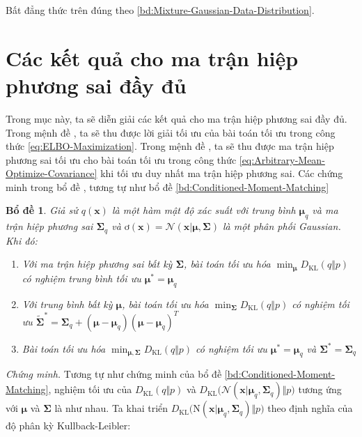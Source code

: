 \documentclass[14pt, a4paper]{article}
\numberwithin{equation}{section}
\numberwithin{figure}{section}
\newtheorem{bd}{Bổ đề}
\numberwithin{dl}{section}
\numberwithin{md}{section}
\numberwithin{bd}{section}
\numberwithin{dn}{section}
\numberwithin{hq}{section}
\begin{document}
    Bất đẳng thức trên đúng theo \ref{bd:Mixture-Gaussian-Data-Distribution}.

    \section{Các kết quả cho ma trận hiệp phương sai đầy đủ}

    Trong mục này, ta sẽ diễn giải các kết quả cho ma trận hiệp phương sai đầy đủ. 
    Trong mệnh đề , ta sẽ thu được lời giải tối ưu của bài toán tối ưu trong công thức \ref{eq:ELBO-Maximization}.
    Trong mệnh đề , ta sẽ thu được ma trận hiệp phương sai tối ưu cho bài toán tối ưu trong công thức \ref{eq:Arbitrary-Mean-Optimize-Covariance} khi tối ưu duy nhất ma trận hiệp phương sai.
    Các chứng minh trong bổ đề , tương tự như bổ đề \ref{bd:Conditioned-Moment-Matching}

    \begin{bd} \label{bd:Joint-Optimal-Solution-Full-Covariance}
        Giả sử $q(\boldsymbol{x})$ là một hàm mật độ xác suất với trung bình $\boldsymbol{\mu}_q$ và ma trận hiệp phương sai $\boldsymbol{\Sigma}_q$ và $ơ(\boldsymbol{x})=\mathcal{N}(\boldsymbol{x} \vert \boldsymbol{\mu}, \boldsymbol{\Sigma})$ là một phân phối Gaussian. Khi đó:

        \begin{enumerate}
            \item Với ma trận hiệp phương sai bất kỳ $\boldsymbol{\Sigma}$, bài toán tối ưu hóa $\displaystyle\min_{\boldsymbol{\mu}} D_{\mathrm{KL}} (q \Vert p)$ có nghiệm trung bình tối ưu $\boldsymbol{\mu}^{\ast}=\boldsymbol{\mu}_q$
            \item Với trung bình bất kỳ $\boldsymbol{\mu}$, bài toán tối ưu hóa $\displaystyle\min_{\boldsymbol{\Sigma}} D_{\mathrm{KL}} (q \Vert p)$ có nghiệm tối ưu $\tilde{\boldsymbol{\Sigma}}^{\ast}=\boldsymbol{\Sigma}_q + (\boldsymbol{\mu} - \boldsymbol{\mu}_q)(\boldsymbol{\mu} - \boldsymbol{\mu}_q)^T$
            \item Bài toán tối ưu hóa $\displaystyle\min_{\boldsymbol{\mu}, \boldsymbol{\Sigma}} D_{\mathrm{KL}} (q \Vert p)$ có nghiệm tối ưu $\boldsymbol{\mu}^{\ast}=\boldsymbol{\mu}_q$ và $\boldsymbol{\Sigma}^{\ast} = \boldsymbol{\Sigma}_q$
        \end{enumerate}
    \end{bd}

    \textit{Chứng minh.}
    Tương tự như chứng minh của bổ đề \ref{bd:Conditioned-Moment-Matching}, nghiệm tối ưu của $D_{\mathrm{KL}}(q \Vert p)$ và $D_{\mathrm{KL}}\big( \mathcal{N} (\boldsymbol{x} \vert \boldsymbol{\mu}_q, \boldsymbol{\Sigma}_q) \Vert p \big)$ tương ứng với $\boldsymbol{\mu}$ và $\boldsymbol{\Sigma}$ là như nhau.
    Ta khai triển $D_{\mathrm{KL}} \big( \mathrm{N}(\boldsymbol{x} \vert \boldsymbol{\mu}_q, \boldsymbol{\Sigma}_q ) \Vert p \big)$ theo định nghĩa của độ phân kỳ Kullback-Leibler:
\end{document}
